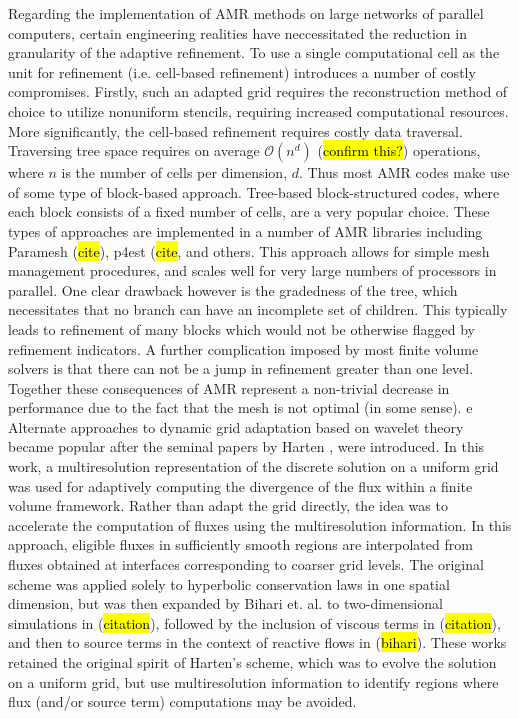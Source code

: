 \documentclass[]{article}
\begin{document}
    Regarding the implementation of AMR methods on large networks of parallel
    computers, certain engineering realities have neccessitated the reduction in
    granularity of the adaptive refinement. To use a single computational cell
    as the unit for refinement (i.e. cell-based refinement) introduces a number
    of costly compromises. Firstly, such an adapted grid requires the
    reconstruction method of choice to utilize nonuniform stencils, requiring
    increased computational resources. More significantly, the cell-based
    refinement requires costly data traversal. Traversing tree space requires on
    average $\mathcal{O}(n^d)$ (\hl{confirm this?}) operations, where $n$ is the
    number of cells per dimension, $d$. Thus most AMR codes make use of some
    type of block-based approach. Tree-based block-structured codes, where each
    block consists of a fixed number of cells, are a very popular choice. These
    types of approaches are implemented in a number of AMR libraries including
    Paramesh (\hl{cite}), p4est (\hl{cite}, and others. This approach allows for
    simple mesh management procedures, and scales well for very large numbers of
    processors in parallel.  One clear drawback however is the gradedness of the
    tree, which necessitates that no branch can have an incomplete set of
    children. This typically leads to refinement of many blocks which would not
    be otherwise flagged by refinement indicators. A further complication
    imposed by most finite volume solvers is that there can not be a jump in
    refinement greater than one level. Together these consequences of AMR
    represent a non-trivial decrease in performance due to the fact that the
    mesh is not optimal (in some sense).
e
    Alternate approaches to dynamic grid adaptation based on wavelet theory
    became popular after the seminal papers by Harten \cite{harten1994}, were
    introduced. In this work, a multiresolution representation of the discrete
    solution on a uniform grid was used for adaptively computing the divergence
    of the flux within a finite volume framework. Rather than adapt the grid
    directly, the idea was to accelerate the computation of fluxes using the
    multiresolution information. In this approach, eligible fluxes in
    sufficiently smooth regions are interpolated from fluxes obtained at
    interfaces corresponding to coarser grid levels. The original scheme was
    applied solely to hyperbolic conservation laws in one spatial dimension, but
    was then expanded by Bihari et. al. to two-dimensional simulations in
    (\hl{citation}), followed by the inclusion of viscous terms in
    (\hl{citation}), and then to source terms in the context of reactive flows
    in (\hl{bihari}). These works retained the original spirit of Harten's
    scheme, which was to evolve the solution on a uniform grid, but use
    multiresolution information to identify regions where flux (and/or source
    term) computations may be avoided.
\end{document}
